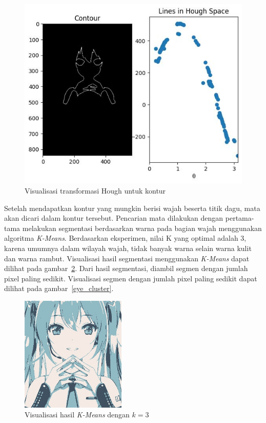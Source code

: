 \documentclass[conference, a4paper]{IEEEtran}
\begin{document}
\begin{figure}[ht]
  \begin{center}
    \includegraphics[width=\columnwidth]{img/process_hough_1.jpg}
  \end{center}
  \caption{Visualisasi transformasi Hough untuk kontur}\label{viz_hough}
\end{figure}

Setelah mendapatkan kontur yang mungkin berisi wajah beserta titik dagu, mata akan dicari dalam kontur tersebut. Pencarian mata dilakukan dengan pertama-tama melakukan segmentasi berdasarkan warna pada bagian wajah menggunakan algoritma \textit{K-Means}. Berdasarkan eksperimen, nilai K yang optimal adalah 3, karena umumnya dalam wilayah wajah, tidak banyak warna selain warna kulit dan warna rambut. Visualisasi hasil segmentasi menggunakan \textit{K-Means} dapat dilihat pada gambar~\ref{kmeans}. Dari hasil segmentasi, diambil segmen dengan jumlah pixel paling sedikit. Visualisasi segmen dengan jumlah pixel paling sedikit dapat dilihat pada gambar~\ref{eye_cluster}.

\begin{figure}[ht]
  \begin{center}
    \includegraphics[width=5cm]{img/process_seg_kmeans.jpg}
  \end{center}
  \caption{Visualisasi hasil \textit{K-Means} dengan $k=3$}\label{kmeans}
\end{figure}
\end{document}
